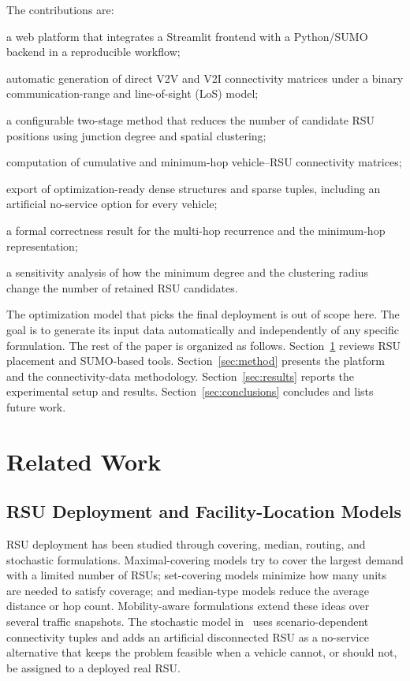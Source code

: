 \documentclass[engproc,proceedingpaper,submit,oneauthor]{Definitions/mdpi}
\newcommand{\added}[1]{{\color{revisionblue}#1}}
\begin{document}
	The contributions are:
	\begin{enumerate}
		\item a web platform that integrates a Streamlit frontend with a Python/SUMO backend
		in a reproducible workflow;
		\item automatic generation of direct V2V and V2I connectivity matrices under a binary
		communication-range and line-of-sight (LoS) model;
		\item a configurable two-stage method that reduces the number of candidate RSU
		positions using junction degree and spatial clustering;
		\item computation of cumulative and minimum-hop vehicle--RSU connectivity matrices;
		\item export of optimization-ready dense structures and sparse tuples, including an
		artificial no-service option for every vehicle;
		\added{\item a formal correctness result for the multi-hop recurrence and the
			minimum-hop representation;}
		\added{\item a sensitivity analysis of how the minimum degree and the clustering
			radius change the number of retained RSU candidates.}
	\end{enumerate}
	
	The optimization model that picks the final deployment is out of scope here. The goal
	is to generate its input data automatically and independently of any specific
	formulation. The rest of the paper is organized as follows. Section~\ref{sec:related}
	reviews RSU placement and SUMO-based tools. Section~\ref{sec:method} presents the
	platform and the connectivity-data methodology. Section~\ref{sec:results} reports the
	experimental setup and results. Section~\ref{sec:conclusions} concludes and lists
	future work.
	
	\section{Related Work}\label{sec:related}
	
	\subsection{RSU Deployment and Facility-Location Models}
	RSU deployment has been studied through covering, median, routing, and stochastic
	formulations. Maximal-covering models try to cover the largest demand with a limited
	number of RSUs; set-covering models minimize how many units are needed to satisfy
	coverage; and median-type models reduce the average distance or hop count.
	Mobility-aware formulations extend these ideas over several traffic snapshots. The
	stochastic model in~\citep{ref-urquiza} uses scenario-dependent connectivity tuples
	and adds an artificial disconnected RSU as a no-service alternative that keeps the
	problem feasible when a vehicle cannot, or should not, be assigned to a deployed real
	RSU.
	
\end{document}
